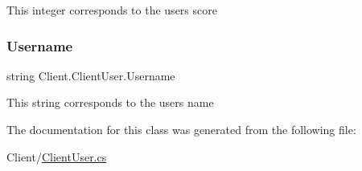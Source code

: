 This integer corresponds to the user\textquotesingle{}s score \mbox{\label{class_client_1_1_client_user_a6d7e902f2d43717e5a1bf49ff584f1ba}} 
\subsubsection{\texorpdfstring{Username}{Username}}
{\footnotesize\ttfamily string Client.\+Client\+User.\+Username}

This string corresponds to the user\textquotesingle{}s name 

The documentation for this class was generated from the following file\+:\begin{DoxyCompactItemize}
\item 
Client/\hyperlink{_client_user_8cs}{Client\+User.\+cs}\end{DoxyCompactItemize}
